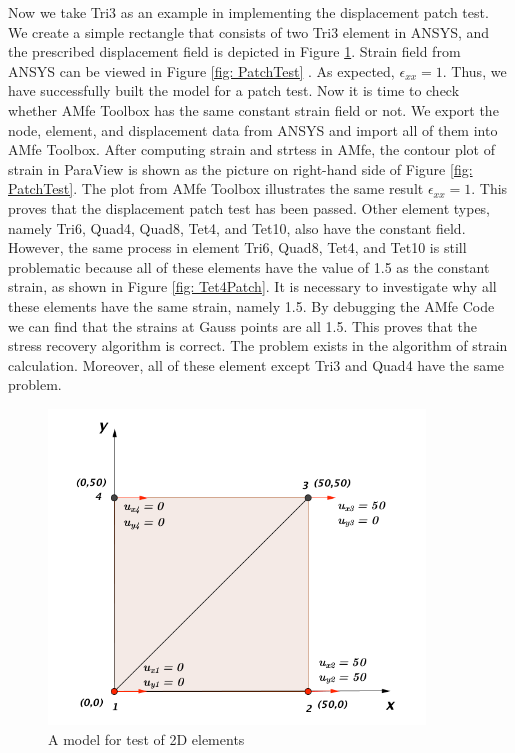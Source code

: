 Now we take Tri3 as an example in implementing the displacement patch test. We create a simple rectangle that consists of two Tri3 element in ANSYS, and the prescribed displacement field is depicted in Figure \ref{fig: PatchMuster}. Strain field from ANSYS can be viewed in Figure \ref{fig: PatchTest} . As expected, $\epsilon_{xx} = 1$. Thus, we have successfully built the model for a patch test. Now it is time to check whether AMfe Toolbox has the same constant strain field or not. We export the node, element, and displacement data from ANSYS and import all of them into AMfe Toolbox. After computing strain and strtess in AMfe, the contour plot of strain in ParaView is shown as the picture on right-hand side of Figure \ref{fig: PatchTest}. The plot from AMfe Toolbox illustrates the same result $\epsilon_ {xx} = 1$. This proves that the displacement patch test has been passed. Other element types,  namely Tri6, Quad4, Quad8, Tet4, and Tet10, also have the constant field. However, the same process in  element Tri6, Quad8, Tet4, and Tet10 is still problematic because all of these elements have the value of 1.5 as the constant strain, as shown in Figure \ref{fig: Tet4Patch}. It is necessary to investigate why all these elements have the same strain, namely 1.5.  By debugging the AMfe Code we can find that the strains at Gauss points are all 1.5. This proves that the stress recovery algorithm is correct. The problem exists in the algorithm of strain calculation. Moreover, all of these element except Tri3 and Quad4 have the same problem.   

\begin{figure}
	\begin{center}
		\includegraphics[width=10cm,clip]{PatchMuster.pdf} 			
		\caption{A model for test of 2D elements} \label{fig: PatchMuster}
	\end{center}
\end{figure}

